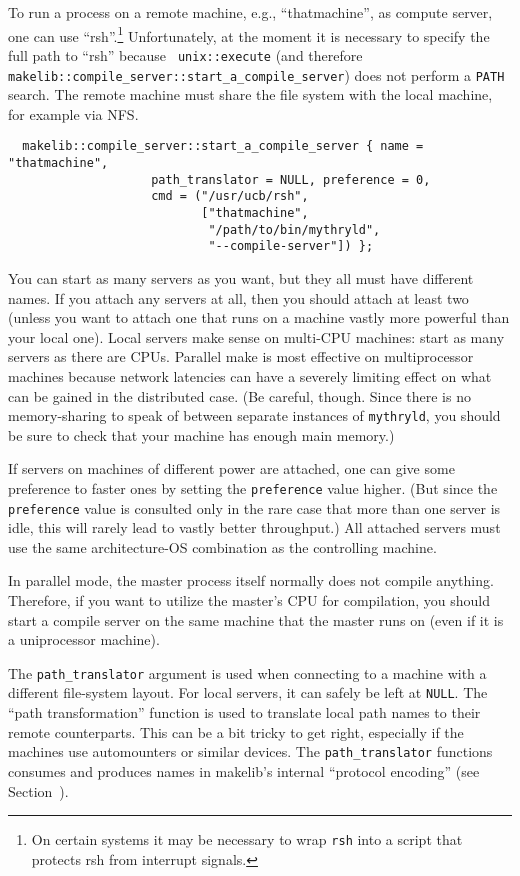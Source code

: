 To run a process on a remote machine, e.g., ``thatmachine'', as
compute server, one can use ``rsh''.\footnote{On certain systems it
may be necessary to wrap {\tt rsh} into a script that protects rsh
from interrupt signals.}  Unfortunately, at the moment it
is necessary to specify the full path to ``rsh'' because {\tt
unix::execute} (and therefore {\tt makelib::compile_server::start_a_compile_server})
does not perform a {\tt PATH} search. The remote machine
must share the file system with the local machine, for example via NFS.

\begin{verbatim}
  makelib::compile_server::start_a_compile_server { name = "thatmachine",
                    path_translator = NULL, preference = 0,
                    cmd = ("/usr/ucb/rsh",
                           ["thatmachine",
                            "/path/to/bin/mythryld",
                            "--compile-server"]) };
\end{verbatim}

You can start as many servers as you want, but they all must have
different names.  If you attach any servers at all, then you should
attach at least two (unless you want to attach one that runs on a
machine vastly more powerful than your local one).  Local servers make
sense on multi-CPU machines: start as many servers as there are CPUs.
Parallel make is most effective on multiprocessor machines because
network latencies can have a severely limiting effect on what can be
gained in the distributed case.
(Be careful, though.  Since there is no memory-sharing to speak of
between separate instances of {\tt mythryld}, you should be sure to check
that your machine has enough main memory.)

If servers on machines of different power are attached, one can give
some preference to faster ones by setting the {\tt preference} value higher.
(But since the {\tt preference} value is consulted only in the rare case
that more than one server is idle, this will rarely lead to vastly
better throughput.) All attached servers must use the same
architecture-OS combination as the controlling machine.

In parallel mode, the master process itself normally does not compile
anything.  Therefore, if you want to utilize the master's CPU for
compilation, you should start a compile server on the same machine
that the master runs on (even if it is a uniprocessor machine).

The {\tt path_translator} argument is used when connecting to a machine with
a different file-system layout.  For local servers, it can safely be
left at {\tt NULL}.  The ``path transformation'' function is used to
translate local path names to their remote counterparts.  This can be
a bit tricky to get right, especially if the machines use automounters
or similar devices.  The {\tt path_translator} functions consumes and
produces names in makelib's internal ``protocol encoding'' (see
Section~).

